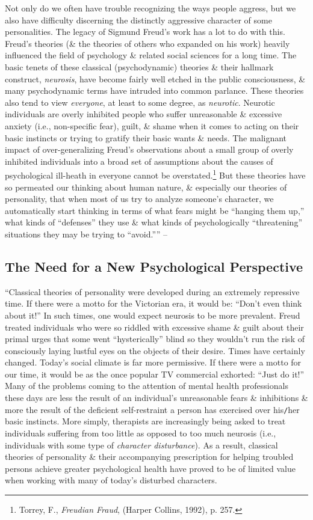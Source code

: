 \documentclass{article}
\numberwithin{equation}{section}
\begin{document}
Not only do we often have trouble recognizing the ways people aggress, but we also have difficulty discerning the distinctly aggressive character of some personalities. The legacy of Sigmund Freud's work has a lot to do with this. Freud's theories (\& the theories of others who expanded on his work) heavily influenced the field of psychology \& related social sciences for a long time. The basic tenets of these classical (psychodynamic) theories \& their hallmark construct, \textit{neurosis}, have become fairly well etched in the public consciousness, \& many psychodynamic terms have intruded into common parlance. These theories also tend to view \textit{everyone}, at least to some degree, as \textit{neurotic}. Neurotic individuals are overly inhibited people who suffer unreasonable \& excessive anxiety (i.e., non-specific fear), guilt, \& shame when it comes to acting on their basic instincts or trying to gratify their basic wants \& needs. The malignant impact of over-generalizing Freud's observations about a small group of overly inhibited individuals into a broad set of assumptions about the causes of psychological ill-heath in everyone cannot be overstated.\footnote{Torrey, F., \textit{Freudian Fraud}, (Harper Collins, 1992), p. 257.} But these theories have so permeated our thinking about human nature, \& especially our theories of personality, that when most of us try to analyze someone's character, we automatically start thinking in terms of what fears might be ``hanging them up,'' what kinds of ``defenses'' they use \& what kinds of psychologically ``threatening'' situations they may be trying to ``avoid.'''' -- \cite[pp. 23--25]{Simon2010}

\subsection{The Need for a New Psychological Perspective}
``Classical theories of personality were developed during an extremely repressive time. If there were a motto for the Victorian era, it would be: ``Don't even think about it!'' In such times, one would expect neurosis to be more prevalent. Freud treated individuals who were so riddled with excessive shame \& guilt about their primal urges that some went ``hysterically'' blind so they wouldn't run the risk of consciously laying lustful eyes on the objects of their desire. Times have certainly changed. Today's social climate is far more permissive. If there were a motto for our time, it would be as the once popular TV commercial exhorted: ``Just do it!'' Many of the problems coming to the attention of mental health professionals these days are less the result of an individual's unreasonable fears \& inhibitions \& more the result of the deficient self-restraint a person has exercised over his\texttt{/}her basic instincts. More simply, therapists are increasingly being asked to treat individuals suffering from too little as opposed to too much neurosis (i.e., individuals with some type of \textit{character disturbance}). As a result, classical theories of personality \& their accompanying prescription for helping troubled persons achieve greater psychological health have proved to be of limited value when working with many of today's disturbed characters.
\end{document}
